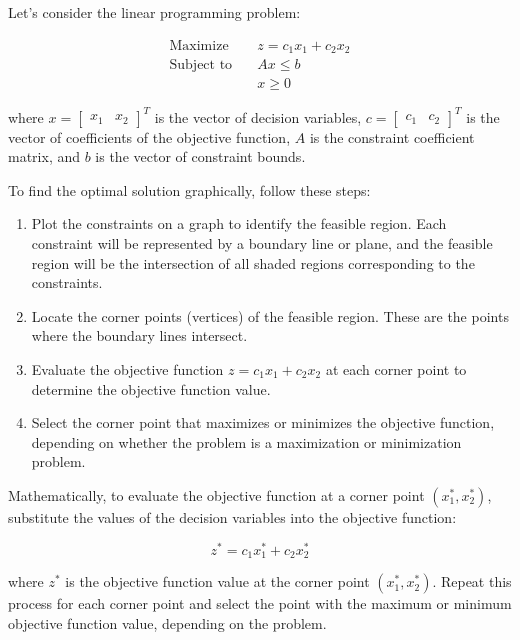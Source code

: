 \documentclass[12pt]{book} %
\begin{document}
Let's consider the linear programming problem:

\[
\begin{aligned}
\text{Maximize} \quad & z = c_1 x_1 + c_2 x_2 \\
\text{Subject to} \quad & Ax \leq b \\
& x \geq 0
\end{aligned}
\]

where \( x = \begin{bmatrix} x_1 & x_2 \end{bmatrix}^T \) is the vector of decision variables, \( c = \begin{bmatrix} c_1 & c_2 \end{bmatrix}^T \) is the vector of coefficients of the objective function, \( A \) is the constraint coefficient matrix, and \( b \) is the vector of constraint bounds.

To find the optimal solution graphically, follow these steps:

\begin{enumerate}
    \item Plot the constraints on a graph to identify the feasible region. Each constraint will be represented by a boundary line or plane, and the feasible region will be the intersection of all shaded regions corresponding to the constraints.
    
    \item Locate the corner points (vertices) of the feasible region. These are the points where the boundary lines intersect.
    
    \item Evaluate the objective function \( z = c_1 x_1 + c_2 x_2 \) at each corner point to determine the objective function value.
    
    \item Select the corner point that maximizes or minimizes the objective function, depending on whether the problem is a maximization or minimization problem.
\end{enumerate}

Mathematically, to evaluate the objective function at a corner point \( (x_1^*, x_2^*) \), substitute the values of the decision variables into the objective function:

\[
z^* = c_1 x_1^* + c_2 x_2^*
\]

where \( z^* \) is the objective function value at the corner point \( (x_1^*, x_2^*) \). Repeat this process for each corner point and select the point with the maximum or minimum objective function value, depending on the problem.
\end{document}
